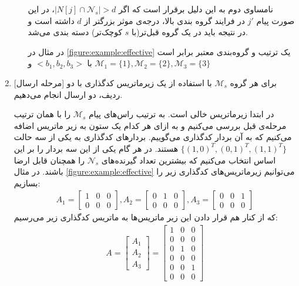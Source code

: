 \begin{enumerate}
\begin{enumerate}
			 نامساوی دوم به این دلیل برقرار است که اگر
			 $|N[j] \cap \mathcal{N}_s | > d$،
			 در این صورت پیام
			 $j'$
			 در فرایند گروه بندی بالا، درجه‌ی موثر بزرگتر از
			 $d$
			 داشته است و در نتیجه باید در یک گروه قبل‌تر(با
			 $s$
			 کوچک‌تر) دسته بندی می‌شد.
			 
			 در مثال در
			 \autoref{figure:example:effective}
			 یک ترتیب و گروه‌بندی معتبر برابر است با
			 $<b_1, b_2, b_3>$
			 و
			 $\mathcal{M}_1 = \{1\}, \mathcal{M}_2 = \{2\}, \mathcal{M}_3 = \{3\}$
		\end{enumerate}
	\item{[مرحله ارسال]}
	برای هر گروه
	$\mathcal{M}_s$
	با استفاده از یک زیرماتریس کدگذاری با دو ردیف، دو ارسال انجام می‌دهیم.
	
	در ابتدا زیرماتریس خالی است. به ترتیب راس‌های پیام
	$\mathcal{M}_s$
	را با همان ترتیب مرحله‌ی قبل بررسی می‌کنیم و به ازای هر کدام یک ستون به زیر ماتریس اضافه می‌کنیم که به آن بردار کدگذاری می‌گوییم. بردارهای کدگذاری به یکی از سه حالت
	$\{(1, 0)^T, (0, 1)^T, (1, 1)^T\}$
	هستند. در هر گام یکی از این سه بردار را بر این اساس انتخاب می‌کنیم که بیشترین تعداد گیرنده‌های
	$\mathcal{N}_s$
	را همچنان قابل ارضا باشند. در مثال
	\autoref{figure:example:effective}
	می‌توانیم زیرماتریس‌های کدگذاری زیر را بسازیم:
	\begin{align*}
		A_1 = \begin{bmatrix}
			1 & 0 & 0 \\
			0 & 0 & 0
		\end{bmatrix}, 
		A_2 =   \begin{bmatrix}
			0 & 1 & 0 \\
			0 & 0 & 0
		\end{bmatrix},
		A_3 =   \begin{bmatrix}
			0 & 0 & 1 \\
			0 & 0 & 0
		\end{bmatrix}
	\end{align*}
	که از کنار هم قرار دادن این زیر ماتریس‌ها به ماتریس کدگذاری زیر می‌رسیم:
		\begin{align*}
		A =  \begin{bmatrix}
			A_1\\
			A_2\\
			A_3
				\end{bmatrix}
			= \begin{bmatrix}
			1 & 0 & 0 \\
			0 & 0 & 0 \\
			0 & 1 & 0 \\
			0 & 0 & 0 \\
			0 & 0 & 1 \\
			0 & 0 & 0
		\end{bmatrix}
			\end{align*}
\end{enumerate}
